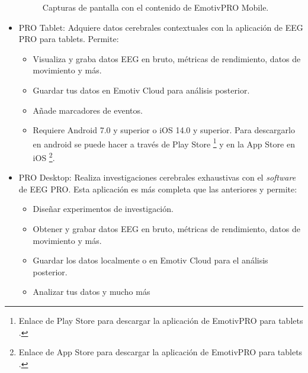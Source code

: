 \begin{itemize}
\begin{figure}[H]
    \caption{Capturas de pantalla con el contenido de EmotivPRO Mobile.}
    \label{fig: CapturasEmotivPROMobile}
    \end{figure}
    \item PRO Tablet: Adquiere datos cerebrales contextuales con la aplicación de EEG PRO para tablets. Permite:
    \begin{itemize}
        \item Visualiza y graba datos EEG en bruto, métricas de rendimiento, datos de movimiento y más.
        \item Guardar tus datos en Emotiv Cloud para análisis posterior.
        \item Añade marcadores de eventos.
        \item Requiere Android 7.0 y superior o iOS 14.0 y superior. Para descargarlo en android se puede hacer a través de Play Store \cite{EmotivPROTabletAndroid}\footnote{Enlace de Play Store para descargar la aplicación de EmotivPRO para tablets \cite{EmotivPROTabletAndroid}.} y en la App Store en iOS \cite{EmotivPROTabletIOS}\footnote{Enlace de App Store para descargar la aplicación de EmotivPRO para tablets \cite{EmotivPROTabletIOS}.}.
    \end{itemize}
    \item PRO Desktop: Realiza investigaciones cerebrales exhaustivas con el \textit{software} de EEG PRO. Esta aplicación es más completa que las anteriores y permite:
    \begin{itemize}
        \item Diseñar experimentos de investigación.
        \item Obtener y grabar datos EEG en bruto, métricas de rendimiento, datos de movimiento y más.
        \item Guardar los datos localmente o en Emotiv Cloud para el análisis posterior.
        \item Analizar tus datos y mucho más
    \end{itemize}
\end{itemize}

